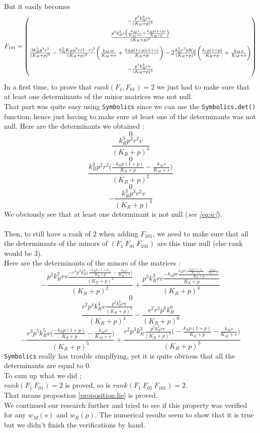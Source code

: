 \documentclass{tudelft-report}
\begin{document}
But it easily becomes 
$$F_{101} = 
\begin{pmatrix}
 \vspace{0.2cm}
 -\frac{p^3k_R^3rv}{(K_R+p)^3}\\
  \vspace{0.2cm}
 \frac{p^2k_R^2r\big(\frac{k_Ms}{K_M+s} + \frac{k_Rp(1+p)}{K_R+p}\big)}{(K_R+p)^2}\\
  \vspace{0.2cm}
 \frac{3k_R^3p^3r^2}{(K_R+p)^3}-\frac{k_R^2K_Rp^2r(1-r)^2}{(K_R+p)^3}\bigg(\frac{k_Msr}{K_M+s}+\frac{k_Rp(1+p)(1+r)}{K_R+p}\bigg)-2\frac{k_R^2r^2pK_R}{(K_R+p)^3}\bigg(\frac{k_rp(1+p)}{K_R+p}+\frac{k_Ms}{K_M+s}\bigg) \\
  \vspace{0.2cm}
 -\frac{p^3k_R^3rv}{(K_R+p)^3}
\end{pmatrix}
$$
In a first time, to prove that $rank(F_1, F_{01}) = 2$ we just had to make sure that at least one determinants of the minor matrices was not null.\\
That part was quite easy using \verb|Symbolics| since we can use the \verb|Symbolics.det()| function, hence just having to make sure at least one of the determinants was not null. Here are the determinants we obtained : 
$$0$$
$$\frac{k_R^3p^3r^2v}{(K_R+p)^3}$$
$$0 $$
$$ \frac{k_R^2p^2r^2\big(\frac{-k_Rp(1+p)}{K_R+p} - \frac{k_Ms}{K_M+s}\big)}{(K_R+p)^2}$$ 
$$ 0$$
$$ -\frac{k_R^3p^3r^2v}{(K_R+p)^3}$$ 
We obviously see that at least one determinant is not null (\emph{see \eqref{eq:ic}}). \\
\\
Then, to still have a rank of $2$ when adding $F_{101}$, we need to make sure that all the determinants of the minors of $(F_1\ F_{01}\ F_{101})$ are this time null (else rank would be $3$). \\
Here are the determinants of the minors of the matrices : 
$$-\frac{p^2k_R^2rv\frac{-r^2p^3k_R^3\big(\frac{-k_Rp(1+p)}{K_R+p}-\frac{k_Ms}{K_M+s}\big)}{(K_R+p)^3}}{(K_R+p)^2} + \frac{p^3k_R^3rv\frac{-k_Rpr\frac{k_Rpr\big(\frac{-k_Rp(1+p)}{K_R+p}-\frac{k_Ms}{K_M+s}\big)}{K_R+p}}{K_R+p}}{(K_R+p)^3}$$ 
$$ 0$$
$$ \frac{r^2p^4k_R^4v\frac{p^2k_R^2rv}{(K_R+p)^2}}{(K_R+p)^4} - \frac{v^2r^3p^6k_R^6}{(K_R+p)^6}$$
$$ -\frac{r^3p^5k_R^5v\big(\frac{-k_Rp(1+p)}{K_R+p}-\frac{k_Ms}{K_M+s}\big)}{(K_R+p)^5} + \frac{r^2p^3k_R^3\frac{p^2k_R^2rv}{(K_R+p)^2}\big(-\frac{k_Rp(1+p)}{K_R+p} - \frac{k_Ms}{K_M+s}\big)}{(K_R+p)^3}$$
\verb|Symbolics| really has trouble simplfying, yet it is quite obvious that all the determinants are equal to $0$.\\
To sum up what we did ; \\
$rank(F_1\ F_{01}) = 2$ is proved, so is $rank(F_1\ F_{01}\ F_{101}) = 2$.\\
That means propostion \ref{proposition:lie} is proved.\\
We continued our research further and tried to see if this property was verified for any $w_M(s)$ and $w_R(p)$. The numerical results seem to show that it is true but we didn't finish the verifications by hand.
\end{document}
